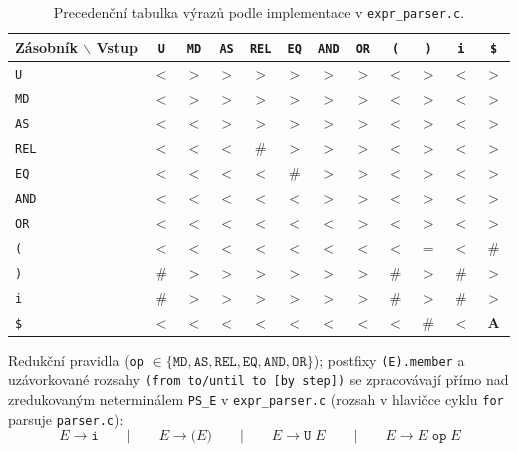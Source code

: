 \documentclass[11pt, a4paper]{article}
\renewcommand{\arraystretch}{1.15}%
\begin{document}
\begin{table}[H]
  \centering
  \small
  \renewcommand{\arraystretch}{1.1}
  \setlength{\tabcolsep}{5pt}
  \begin{tabular}{lccccccccccc}
    \toprule
    \textbf{Zásobník $\backslash$ Vstup} & \texttt{U} & \texttt{MD} & \texttt{AS} & \texttt{REL} & \texttt{EQ} & \texttt{AND} & \texttt{OR} & \texttt{(} & \texttt{)} & \texttt{i} & \texttt{\$} \\
    \midrule
    \texttt{U}   & $<$ & $>$ & $>$ & $>$ & $>$ & $>$ & $>$ & $<$ & $>$ & $<$ & $>$ \\
    \texttt{MD}  & $<$ & $>$ & $>$ & $>$ & $>$ & $>$ & $>$ & $<$ & $>$ & $<$ & $>$ \\
    \texttt{AS}  & $<$ & $<$ & $>$ & $>$ & $>$ & $>$ & $>$ & $<$ & $>$ & $<$ & $>$ \\
    \texttt{REL} & $<$ & $<$ & $<$ & \#  & $>$ & $>$ & $>$ & $<$ & $>$ & $<$ & $>$ \\
    \texttt{EQ}  & $<$ & $<$ & $<$ & $<$ & \#  & $>$ & $>$ & $<$ & $>$ & $<$ & $>$ \\
    \texttt{AND} & $<$ & $<$ & $<$ & $<$ & $<$ & $>$ & $>$ & $<$ & $>$ & $<$ & $>$ \\
    \texttt{OR}  & $<$ & $<$ & $<$ & $<$ & $<$ & $<$ & $>$ & $<$ & $>$ & $<$ & $>$ \\
    \texttt{(}   & $<$ & $<$ & $<$ & $<$ & $<$ & $<$ & $<$ & $<$ & $=$ & $<$ & \#  \\
    \texttt{)}   & \#  & $>$ & $>$ & $>$ & $>$ & $>$ & $>$ & \#  & $>$ & \#  & $>$ \\
    \texttt{i}   & \#  & $>$ & $>$ & $>$ & $>$ & $>$ & $>$ & \#  & $>$ & \#  & $>$ \\
    \texttt{\$}  & $<$ & $<$ & $<$ & $<$ & $<$ & $<$ & $<$ & $<$ & \#  & $<$ & \textbf{A} \\
    \bottomrule
  \end{tabular}
  \caption{Precedenční tabulka výrazů podle implementace v \texttt{expr\_parser.c}.}
  \label{tab:prec}
\end{table}

Redukční pravidla (\texttt{op} $\in \{\texttt{MD}, \texttt{AS}, \texttt{REL}, \texttt{EQ}, \texttt{AND}, \texttt{OR}\}$); postfixy \texttt{(E).member} a uzávorkované rozsahy \texttt{(from to/until to [by step])} se zpracovávají přímo nad zredukovaným neterminálem \texttt{PS\_E} v \texttt{expr\_parser.c} (rozsah v hlavičce cyklu \texttt{for} parsuje \texttt{parser.c}):
\[
  E \to \texttt{i} \qquad|\qquad E \to \texttt{(} E \texttt{)} \qquad|\qquad E \to \texttt{U}\; E \qquad|\qquad E \to E\; \texttt{op}\; E
\]
\end{document}
